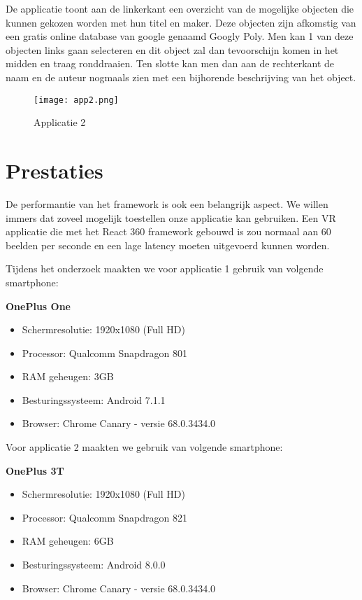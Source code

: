 De applicatie toont aan de linkerkant een overzicht van de mogelijke objecten die kunnen gekozen worden met hun titel en maker. Deze objecten zijn afkomstig van een gratis online database van google genaamd Googly Poly. Men kan 1 van deze objecten links gaan selecteren en dit object zal dan tevoorschijn komen in het midden en traag ronddraaien. Ten slotte kan men dan aan de rechterkant de naam en de auteur nogmaals zien met een bijhorende beschrijving van het object.

\begin{figure}[H]
	\centering
	\texttt{[image: app2.png]}
	\caption{Applicatie 2}
	\label{fig:app2}
\end{figure}

\section{Prestaties}
\label{sec:prestaties}
De performantie van het framework is ook een belangrijk aspect. We willen immers dat zoveel mogelijk toestellen onze applicatie kan gebruiken. Een VR applicatie die met het React 360 framework gebouwd is zou normaal aan 60 beelden per seconde en een lage latency moeten uitgevoerd kunnen worden.

Tijdens het onderzoek maakten we voor applicatie 1 gebruik van volgende smartphone:

\textbf{OnePlus One }
\begin{itemize}
	\item Schermresolutie: 1920x1080 (Full HD)
	\item Processor: Qualcomm Snapdragon 801
	\item RAM geheugen: 3GB
	\item Besturingssysteem: Android 7.1.1
	\item Browser: Chrome Canary - versie 68.0.3434.0
\end{itemize}

Voor applicatie 2 maakten we gebruik van volgende smartphone:

\textbf{OnePlus 3T}
\begin{itemize}
	\item Schermresolutie: 1920x1080 (Full HD)
	\item Processor: Qualcomm Snapdragon 821
	\item RAM geheugen: 6GB
	\item Besturingssysteem: Android 8.0.0
	\item Browser: Chrome Canary - versie 68.0.3434.0
\end{itemize}

